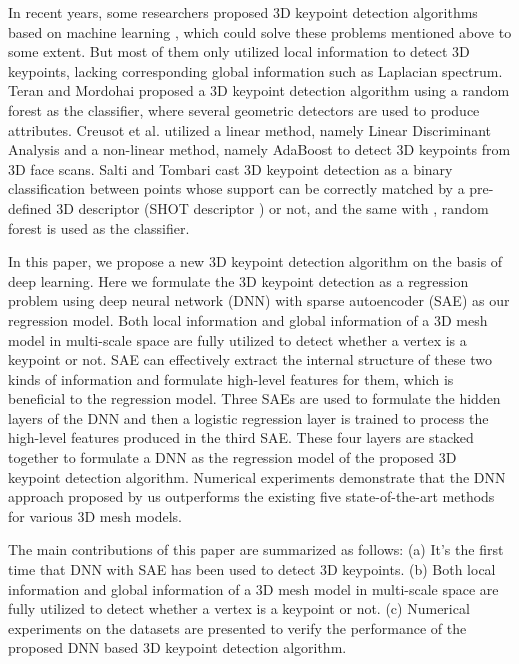 \documentclass[runningheads]{article}
\begin{document}
In recent years, some researchers proposed 3D keypoint detection algorithms based on machine learning \cite{randomforest20143d,machine3dkeypoint2013machine,salti2015learning}, which could solve these problems mentioned above to some extent. But most of them only utilized local information to detect 3D keypoints, lacking corresponding global information such as Laplacian spectrum. Teran and Mordohai \cite{randomforest20143d} proposed a 3D keypoint detection algorithm using a random forest \cite{ran2001random} as the classifier, where several geometric detectors are used to produce attributes. Creusot et al. \cite{machine3dkeypoint2013machine} utilized a linear method, namely Linear Discriminant Analysis and a non-linear method, namely AdaBoost \cite{adaboost1997decision} to detect 3D keypoints from 3D face scans. Salti and Tombari \cite{salti2015learning} cast 3D keypoint detection as a binary  classification between points whose support can be correctly matched by a pre-defined 3D descriptor (SHOT descriptor \cite{shot2010unique}) or not, and the same with \cite{randomforest20143d}, random forest \cite{ran2001random} is used as the classifier.

In this paper, we propose a new 3D keypoint detection algorithm on the basis of deep learning. Here we formulate the 3D keypoint detection as a regression problem using deep neural network (DNN) with sparse autoencoder (SAE) \cite{sae2011sparse} as our regression model. Both local information and global information of a 3D mesh model in multi-scale space are fully utilized to detect whether a vertex is a keypoint or not. SAE can effectively extract the internal structure of these two kinds of information and formulate high-level features for them, which is beneficial to the regression model. Three SAEs are used to formulate the hidden layers of the DNN and then a logistic regression \cite{logistic1958regression} layer is trained to process the high-level features produced in the third SAE. These four layers are stacked together to formulate a DNN as the regression model of the proposed 3D keypoint detection algorithm. Numerical experiments demonstrate that the DNN approach proposed by us outperforms the existing five state-of-the-art methods for various 3D mesh models. 
 
The main contributions of this paper are summarized as follows: (a) It's the first time that DNN with SAE has been used to detect 3D keypoints. (b) Both local information and global information of a 3D mesh model in multi-scale space are fully utilized to detect whether a vertex is a keypoint or not. (c) Numerical experiments on the datasets \cite{dutagaci2012evaluation} are presented to verify the performance of the proposed DNN based 3D keypoint detection algorithm.
\end{document}

